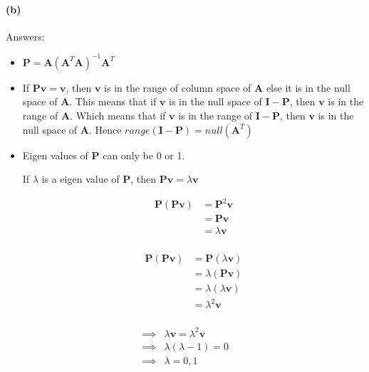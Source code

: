 \documentclass[12pt, letterpaper]{article}
\begin{document}
\paragraph{(b)} Answers:
\begin{itemize}
\item $\mathbf{P} = \mathbf{A}(\mathbf{A}^T\mathbf{A})^{-1}\mathbf{A}^T$
  
\item If $\mathbf{P}\mathbf{v} = \mathbf{v}$, then $\mathbf{v}$ is in the range of column space of $\mathbf{A}$ else it is in the null space of $\mathbf{A}$. This means that if $\mathbf{v}$ is in the null space of $\mathbf{I}- \mathbf{P}$, then $\mathbf{v}$ is in the range of $\mathbf{A}$. Which means that if $\mathbf{v}$ is in the range of $\mathbf{I} - \mathbf{P}$, then $\mathbf{v}$ is in the null space of $\mathbf{A}$. Hence $range(\mathbf{I} - \mathbf{P}) = null(\mathbf{A}^T)$
  
\item Eigen values of $\mathbf{P}$ can only be 0 or 1.

  If $\lambda$ is a eigen value of $\mathbf{P}$, then
  $\mathbf{P}\mathbf{v} = \lambda \mathbf{v}$

\begin{minipage}[bt]{0.45\textwidth}
\begin{align*}
  \mathbf{P}(\mathbf{P}\mathbf{v})
  &= \mathbf{P}^2\mathbf{v}\\
  &= \mathbf{P}\mathbf{v}\\
  &= \lambda \mathbf{v}\\
\end{align*}
\end{minipage}
\hfill 
\begin{minipage}[bt]{0.45\textwidth}
\begin{align*}
  \mathbf{P}(\mathbf{P}\mathbf{v})
  &= \mathbf{P}(\lambda \mathbf{v})\\
  &= \lambda(\mathbf{P} \mathbf{v})\\
  &= \lambda(\lambda \mathbf{v})\\
  &= \lambda^2 \mathbf{v}\\
\end{align*}
\end{minipage}
\end{itemize}

\begin{align*}
  \implies &\lambda \mathbf{v} = \lambda^2 \mathbf{v}\\
  \implies &\lambda(\lambda - 1) = 0\\
  \implies &\lambda = 0,1\\
\end{align*}
\end{document}
